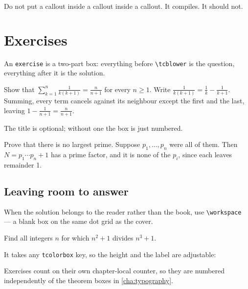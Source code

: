 \begin{failure}
Do not put a callout inside a callout inside a callout. It compiles. It
should not.
\end{failure}

\section{Exercises}

An \texttt{exercise} is a two-part box: everything before \verb|\tcblower| is
the question, everything after it is the solution.

\begin{exercise}
Show that $\sum_{k=1}^{n} \frac{1}{k(k+1)} = \frac{n}{n+1}$ for every
$n \geq 1$.
\tcblower
Write $\frac{1}{k(k+1)} = \frac{1}{k} - \frac{1}{k+1}$. Summing, every term
cancels against its neighbour except the first and the last, leaving
$1 - \frac{1}{n+1} = \frac{n}{n+1}$.
\end{exercise}

The title is optional; without one the box is just numbered.

\begin{exercise}
Prove that there is no largest prime.
\tcblower
Suppose $p_1, \dots, p_n$ were all of them. Then $N = p_1 \cdots p_n + 1$ has
a prime factor, and it is none of the $p_i$, since each leaves remainder 1.
\end{exercise}

\subsection{Leaving room to answer}

When the solution belongs to the reader rather than the book, use
\verb|\workspace| — a blank box on the same dot grid as the cover.

\begin{exercise}
Find all integers $n$ for which $n^2 + 1$ divides $n^3 + 1$.
\end{exercise}

\workspace

It takes any \texttt{tcolorbox} key, so the height and the label are
adjustable:

\workspace[height=22mm, wslabel=Working]

\begin{note}
Exercises count on their own chapter-local counter, so they are numbered
independently of the theorem boxes in \cref{cha:typography}.
\end{note}
